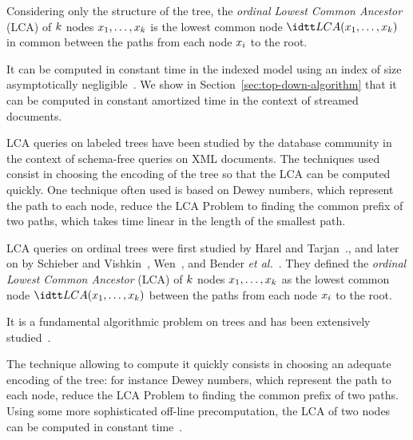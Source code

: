 Considering only the structure of the tree, the {\em ordinal Lowest
  Common Ancestor} (LCA) of $k$ nodes
$x_1,\ldots,x_{k}$ is the lowest common node
$\LCA(\nodex_1,\ldots,\nodex_\nbkeywords)$ in common between the paths
from each node $x_i$ to the root.
%
\begin{SHORT}
  It can be computed in constant time in the indexed model using an
  index of size asymptotically
  negligible~\cite{succinctRepresentationsOfLCPInformationAndImprovementsInTheCompressedSuffixArrays}.
  We show in Section~\ref{sec:top-down-algorithm} that it can be
  computed in constant amortized time in the context of streamed
  documents.
\end{SHORT}
% 
\begin{LONG}
  LCA queries on labeled trees have been studied by the database
  community in the context of schema-free queries on XML documents.
%
  The techniques used consist in choosing the encoding of the tree so
  that the LCA can be computed quickly.
%
  One technique often used is based on Dewey numbers, which represent
  the path to each node, reduce the LCA Problem to finding the common
  prefix of two paths, which takes time linear in the length of the
  smallest path.
 
LCA queries on ordinal trees were first studied by Harel and
Tarjan~\cite{fastAlgorithmsForFindingNearestCommonAncestors}., and
later on by Schieber and
Vishkin~\cite{onFindingLowestCommonAncestorsSimplificationAndParallelization},
Wen~\cite{newAlgorithmsForTheLCAProblemAndTheBinaryTreeReconstructionProblem},
and Bender {\em et
  al.}~\cite{theLevelAncestorProblemSimplified,findingLeastCommonAncestorInDirectedAcyclicGraphs}.
%
They defined
the {\em ordinal Lowest Common Ancestor} (LCA) of $k$ nodes
$x_1,\ldots,x_{k}$ as the lowest common node
$\LCA(\nodex_1,\ldots,\nodex_\nbkeywords)$ between the paths from
each node $x_i$ to the root.

It is a fundamental algorithmic problem on trees and has been
extensively
studied~\cite{fastAlgorithmsForFindingNearestCommonAncestors,
  onFindingLowestCommonAncestorsSimplificationAndParallelization,
  newAlgorithmsForTheLCAProblemAndTheBinaryTreeReconstructionProblem,
  findingLeastCommonAncestorInDirectedAcyclicGraphs}.

The technique allowing to compute it quickly consists in choosing an
adequate encoding of the tree: for instance Dewey numbers, which
represent the path to each node, reduce the LCA Problem to finding the
common prefix of two paths.
%
Using some more sophisticated off-line precomputation, the LCA of two
nodes can be computed in constant
time~\cite{newAlgorithmsForTheLCAProblemAndTheBinaryTreeReconstructionProblem,
  findingLeastCommonAncestorInDirectedAcyclicGraphs}.


\end{LONG}

